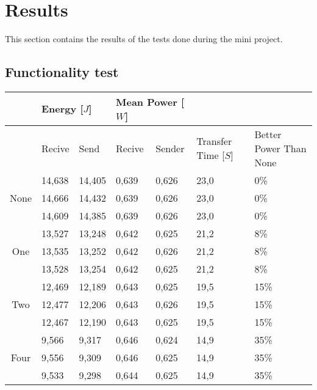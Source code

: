 \section{Results}
This section contains the results of the tests done during the mini project.


\subsection{Functionality test}
\begin{table}[h]
	\begin{tabular}{cllllll}

	\cline{2-5} 
	\multicolumn{1}{l}{} 	& \multicolumn{2}{l}{Energy {[$J$]}} & \multicolumn{2}{l}{Mean Power [$W$]} &	&	\\ \hline
	\rowcolor{gr}
	\multicolumn{1}{l}{Bit Removed}	& Recive	& Send	& Recive	& Sender	& \multicolumn{1}{l}{Transfer Time [$S$]} & \multicolumn{1}{l}{Better Power Than None} \\ \hline
	\multicolumn{1}{c}{\multirow{3}{*}{None}} & 14,638	& 14,405	& 0,639	& 0,626	& \multicolumn{1}{l}{23,0}	& \multicolumn{1}{l}{0\%}	\\  
	\multicolumn{1}{c}{}	& 14,666	& 14,432	& 0,639	& 0,626	& \multicolumn{1}{l}{23,0}	& \multicolumn{1}{l}{0\%}	\\ 
	\multicolumn{1}{c}{}	& 14,609	& 14,385	& 0,639	& 0,626	& \multicolumn{1}{l}{23,0}	& \multicolumn{1}{l}{0\%}	\\ \hline
	\multicolumn{1}{c}{\multirow{3}{*}{One}}  & 13,527	& 13,248	& 0,642	& 0,625	& \multicolumn{1}{l}{21,2}	& \multicolumn{1}{l}{8\%}	\\ %
	\multicolumn{1}{c}{}	& 13,535	& 13,252	& 0,642	& 0,626	& \multicolumn{1}{l}{21,2}	& \multicolumn{1}{l}{8\%}	\\ %
	\multicolumn{1}{c}{}	& 13,528	& 13,254	& 0,642	& 0,625	& \multicolumn{1}{l}{21,2}	& \multicolumn{1}{l}{8\%}	\\ \hline
	\multicolumn{1}{c}{\multirow{3}{*}{Two}}  & 12,469	& 12,189	& 0,643	& 0,625	& \multicolumn{1}{l}{19,5}	& \multicolumn{1}{l}{15\%}	\\ %
	\multicolumn{1}{c}{}	& 12,477	& 12,206	& 0,643	& 0,626	& \multicolumn{1}{l}{19,5}	& \multicolumn{1}{l}{15\%}	\\ %
	\multicolumn{1}{c}{}	& 12,467	& 12,190	& 0,643	& 0,625	& \multicolumn{1}{l}{19,5}	& \multicolumn{1}{l}{15\%}	\\ \hline
	\multicolumn{1}{c}{\multirow{3}{*}{Four}} & 9,566	& 9,317	& 0,646	& 0,624	& \multicolumn{1}{l}{14,9}	& \multicolumn{1}{l}{35\%}	\\ %
	\multicolumn{1}{c}{}	& 9,556	& 9,309	& 0,646	& 0,625	& \multicolumn{1}{l}{14,9}	& \multicolumn{1}{l}{35\%}	\\ %
	\multicolumn{1}{c}{}	& 9,533	& 9,298	& 0,644	& 0,625	& \multicolumn{1}{l}{14,9}	& \multicolumn{1}{l}{35\%}	\\ \hline
	\end{tabular}


\end{table}
